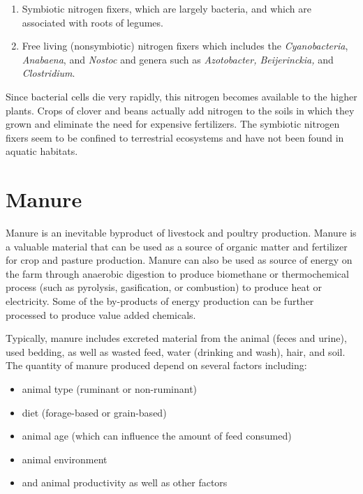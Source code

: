\documentclass[]{book}
\providecommand{\tightlist}{%
  \setlength{\itemsep}{0pt}\setlength{\parskip}{0pt}}
\begin{document}
\begin{enumerate}
\def\labelenumi{\arabic{enumi}.}
\item
  Symbiotic nitrogen fixers, which are largely bacteria, and which are associated with roots of legumes.
\item
  Free living (nonsymbiotic) nitrogen fixers which includes the \emph{Cyanobacteria}, \emph{Anabaena}, and \emph{Nostoc} and genera such as \emph{Azotobacter, Beijerinckia,} and \emph{Clostridium}.
\end{enumerate}

Since bacterial cells die very rapidly, this nitrogen becomes available to the higher plants. Crops of clover and beans actually add nitrogen to the soils in which they grown and eliminate the need for expensive fertilizers. The symbiotic nitrogen fixers seem to be confined to terrestrial ecosystems and have not been found in aquatic habitats.

\hypertarget{manure}{%
\chapter{Manure}\label{manure}}

Manure is an inevitable byproduct of livestock and poultry production. Manure is a valuable material that can be used as a source of organic matter and fertilizer for crop and pasture production. Manure can also be used as source of energy on the farm through anaerobic digestion to produce biomethane or thermochemical process (such as pyrolysis, gasification, or combustion) to produce heat or electricity. Some of the by-products of energy production can be further processed to produce value added chemicals.

Typically, manure includes excreted material from the animal (feces and urine), used bedding, as well as wasted feed, water (drinking and wash), hair, and soil. The quantity of manure produced depend on several factors including:

\begin{itemize}
\tightlist
\item
  animal type (ruminant or non-ruminant)
\item
  diet (forage-based or grain-based)
\item
  animal age (which can influence the amount of feed consumed)
\item
  animal environment
\item
  and animal productivity as well as other factors
\end{itemize}
\end{document}
